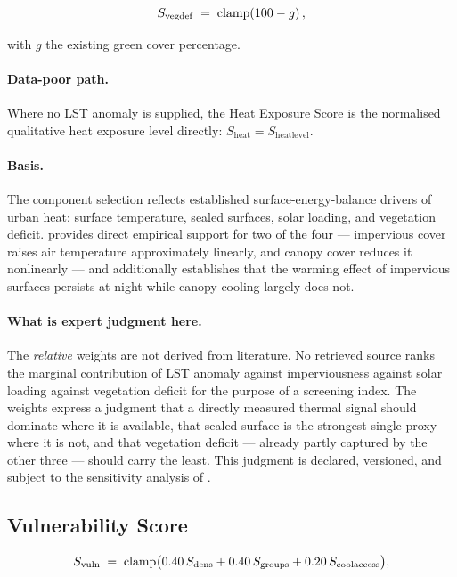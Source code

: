 \begin{equation}
\label{eq:vegdef}
S_{\mathrm{vegdef}} \;=\; \operatorname{clamp}\!\left(100 - g\right),
\end{equation}

with $g$ the existing green cover percentage.

\paragraph{Data-poor path.} Where no LST anomaly is supplied, the Heat Exposure
Score is the normalised qualitative heat exposure level directly:
$S_{\mathrm{heat}} = S_{\mathrm{heatlevel}}$.

\paragraph{Basis.} The component selection reflects established
surface-energy-balance drivers of urban heat: surface temperature, sealed
surfaces, solar loading, and vegetation deficit. \textcite{ziter2019} provides
direct empirical support for two of the four --- impervious cover raises air
temperature approximately linearly, and canopy cover reduces it nonlinearly ---
and additionally establishes that the warming effect of impervious surfaces
persists at night while canopy cooling largely does not.

\paragraph{What is expert judgment here.} The \emph{relative} weights are not
derived from literature. No retrieved source ranks the marginal contribution of
LST anomaly against imperviousness against solar loading against vegetation
deficit for the purpose of a screening index. The weights express a judgment
that a directly measured thermal signal should dominate where it is available,
that sealed surface is the strongest single proxy where it is not, and that
vegetation deficit --- already partly captured by the other three --- should
carry the least. This judgment is declared, versioned, and subject to the
sensitivity analysis of .

\subsection{Vulnerability Score}
\label{sec:vulnerability}

\begin{equation}
\label{eq:vulnerability}
S_{\mathrm{vuln}} \;=\; \operatorname{clamp}\bigl(
  0.40\,S_{\mathrm{dens}}
+ 0.40\,S_{\mathrm{groups}}
+ 0.20\,S_{\mathrm{coolaccess}}\bigr),
\end{equation}

